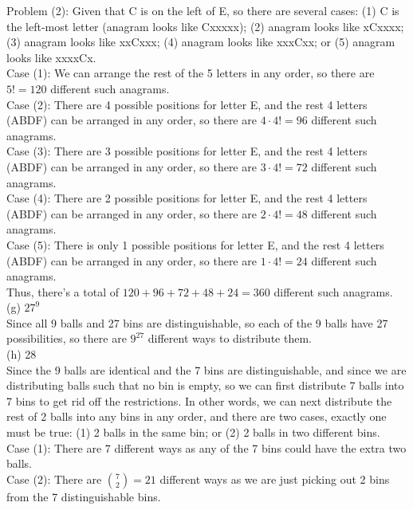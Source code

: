 \documentclass{article}
\begin{document}
Problem (2): Given that C is on the left of E, so there are several cases: (1) C is the left-most letter (anagram looks like Cxxxxx); (2) anagram looks like xCxxxx; (3) anagram looks like xxCxxx; (4) anagram looks like xxxCxx; or (5) anagram looks like xxxxCx. \\[.1cm]
\indent Case (1): We can arrange the rest of the 5 letters in any order, so there are $5! = 120$ different such anagrams. \\
\indent Case (2): There are 4 possible positions for letter E, and the rest 4 letters (ABDF) can be arranged in any order, so there are $4\cdot4! = 96$ different such anagrams. \\
\indent Case (3): There are 3 possible positions for letter E, and the rest 4 letters (ABDF) can be arranged in any order, so there are $3\cdot4! = 72$ different such anagrams. \\
\indent Case (4): There are 2 possible positions for letter E, and the rest 4 letters (ABDF) can be arranged in any order, so there are $2\cdot4! = 48$ different such anagrams. \\
\indent Case (5): There is only 1 possible positions for letter E, and the rest 4 letters (ABDF) can be arranged in any order, so there are $1\cdot4! = 24$ different such anagrams. \\

Thus, there's a total of $120 + 96 + 72 + 48 + 24 = 360$ different such anagrams. \\[.5cm]
{\color{red} (g) $27^9$} \\

Since all 9 balls and 27 bins are distinguishable, so each of the 9 balls have 27 possibilities, so there are $9^{27}$ different ways to distribute them. \\[.5cm]
{\color{red} (h) 28} \\

Since the 9 balls are identical and the 7 bins are distinguishable, and since we are distributing balls such that no bin is empty, so we can first distribute 7 balls into 7 bins to get rid off the restrictions. In other words, we can next distribute the rest of 2 balls into any bins in any order, and there are two cases, exactly one must be true: (1) 2 balls in the same bin; or (2) 2 balls in two different bins. \\

Case (1): There are 7 different ways as any of the 7 bins could have the extra two balls. \\
Case (2): There are $\binom{7}{2} = 21$ different ways as we are just picking out 2 bins from the 7 distinguishable bins. \\
\end{document}
